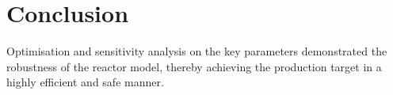\section{Conclusion} \label{sec:conclusion}


Optimisation and sensitivity analysis on the key parameters demonstrated the robustness of the reactor model, thereby achieving the production target in a highly efficient and safe manner. 